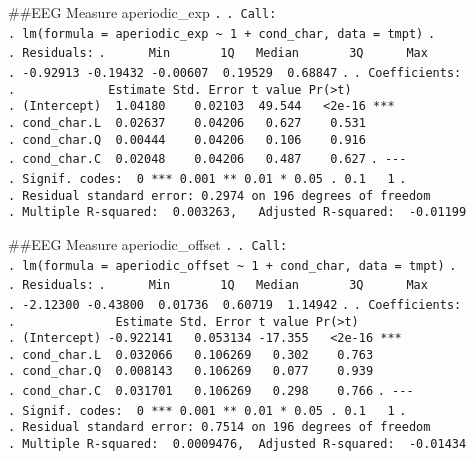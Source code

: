 \documentclass[
]{article}
\begin{document}
\#\#EEG Measure aperiodic\_exp \texttt{.} \texttt{.\ Call:}
\texttt{.\ lm(formula\ =\ aperiodic\_exp\ \textasciitilde{}\ 1\ +\ cond\_char,\ data\ =\ tmpt)}
\texttt{.} \texttt{.\ Residuals:}
\texttt{.\ \ \ \ \ \ Min\ \ \ \ \ \ \ 1Q\ \ \ Median\ \ \ \ \ \ \ 3Q\ \ \ \ \ \ Max}
\texttt{.\ -0.92913\ -0.19432\ -0.00607\ \ 0.19529\ \ 0.68847}
\texttt{.} \texttt{.\ Coefficients:}
\texttt{.\ \ \ \ \ \ \ \ \ \ \ \ \ Estimate\ Std.\ Error\ t\ value\ Pr(\textgreater{}\textbar{}t\textbar{})}
\texttt{.\ (Intercept)\ \ 1.04180\ \ \ \ 0.02103\ \ 49.544\ \ \ \textless{}2e-16\ ***}
\texttt{.\ cond\_char.L\ \ 0.02637\ \ \ \ 0.04206\ \ \ 0.627\ \ \ \ 0.531}
\texttt{.\ cond\_char.Q\ \ 0.00444\ \ \ \ 0.04206\ \ \ 0.106\ \ \ \ 0.916}
\texttt{.\ cond\_char.C\ \ 0.02048\ \ \ \ 0.04206\ \ \ 0.487\ \ \ \ 0.627}
\texttt{.\ -\/-\/-}
\texttt{.\ Signif.\ codes:\ \ 0\ \textquotesingle{}***\textquotesingle{}\ 0.001\ \textquotesingle{}**\textquotesingle{}\ 0.01\ \textquotesingle{}*\textquotesingle{}\ 0.05\ \textquotesingle{}.\textquotesingle{}\ 0.1\ \textquotesingle{}\ \textquotesingle{}\ 1}
\texttt{.}
\texttt{.\ Residual\ standard\ error:\ 0.2974\ on\ 196\ degrees\ of\ freedom}
\texttt{.\ Multiple\ R-squared:\ \ 0.003263,\ \ \ Adjusted\ R-squared:\ \ -0.01199}

\#\#EEG Measure aperiodic\_offset \texttt{.} \texttt{.\ Call:}
\texttt{.\ lm(formula\ =\ aperiodic\_offset\ \textasciitilde{}\ 1\ +\ cond\_char,\ data\ =\ tmpt)}
\texttt{.} \texttt{.\ Residuals:}
\texttt{.\ \ \ \ \ \ Min\ \ \ \ \ \ \ 1Q\ \ \ Median\ \ \ \ \ \ \ 3Q\ \ \ \ \ \ Max}
\texttt{.\ -2.12300\ -0.43800\ \ 0.01736\ \ 0.60719\ \ 1.14942}
\texttt{.} \texttt{.\ Coefficients:}
\texttt{.\ \ \ \ \ \ \ \ \ \ \ \ \ \ Estimate\ Std.\ Error\ t\ value\ Pr(\textgreater{}\textbar{}t\textbar{})}
\texttt{.\ (Intercept)\ -0.922141\ \ \ 0.053134\ -17.355\ \ \ \textless{}2e-16\ ***}
\texttt{.\ cond\_char.L\ \ 0.032066\ \ \ 0.106269\ \ \ 0.302\ \ \ \ 0.763}
\texttt{.\ cond\_char.Q\ \ 0.008143\ \ \ 0.106269\ \ \ 0.077\ \ \ \ 0.939}
\texttt{.\ cond\_char.C\ \ 0.031701\ \ \ 0.106269\ \ \ 0.298\ \ \ \ 0.766}
\texttt{.\ -\/-\/-}
\texttt{.\ Signif.\ codes:\ \ 0\ \textquotesingle{}***\textquotesingle{}\ 0.001\ \textquotesingle{}**\textquotesingle{}\ 0.01\ \textquotesingle{}*\textquotesingle{}\ 0.05\ \textquotesingle{}.\textquotesingle{}\ 0.1\ \textquotesingle{}\ \textquotesingle{}\ 1}
\texttt{.}
\texttt{.\ Residual\ standard\ error:\ 0.7514\ on\ 196\ degrees\ of\ freedom}
\texttt{.\ Multiple\ R-squared:\ \ 0.0009476,\ \ Adjusted\ R-squared:\ \ -0.01434}
\end{document}
